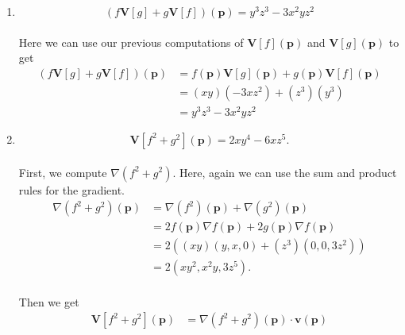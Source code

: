 \documentclass[12 pt, letterpaper]{hmcpset}
\begin{document}
\begin{solution}
\begin{enumerate}
			\[
				\boxed{
					\mathbf V[fg](\mathbf p) = y^3 z^3 - 3 x^2 y z^2
				}
			\] \\
			Note that here, we use the product rule for gradients --- $\nabla(fg) = (\nabla f) g + f (\nabla g)$
			\[
				\begin{split}
					\mathbf V[fg](\mathbf p) & = \nabla(fg) \cdot \mathbf v(\mathbf p) \\
								 & = ((\nabla f)(\mathbf p) g(\mathbf p) + f(\mathbf p) (\nabla g)(\mathbf p)) \cdot \mathbf v(\mathbf p) \\
								 & = g(\mathbf p) (\nabla f)(\mathbf p) \cdot \mathbf v(\mathbf p) + f(\mathbf p) (\nabla g(\mathbf p)) \cdot \mathbf v(\mathbf p) \\
								 & = z^3 y^3 - (xy)3xz^2 \\
								 & = y^3 z^3 - 3 x^2 y z^2.
				\end{split}
			\]
		\item
			\[
				\boxed{
					(f \mathbf V[g] + g \mathbf V[f])(\mathbf p) = y^3 z^3 - 3 x^2 y z^2
				}
			\] \\
			Here we can use our previous computations of $\mathbf V[f](\mathbf p)$ and $\mathbf V[g](\mathbf p)$ to get
			\[
				\begin{split}
					(f \mathbf V[g] + g \mathbf V[f])(\mathbf p) & = f(\mathbf p) \mathbf V[g](\mathbf p) + g(\mathbf p) \mathbf V[f](\mathbf p) \\
										     & = (xy)(-3xz^2) + (z^3)(y^3) \\
										     & = y^3 z^3 - 3 x^2 y z^2
				\end{split}
			\]
		\item
			\[
				\boxed{
					\mathbf V[f^2 + g^2](\mathbf p) = 2 x y^4 - 6 x z^5.
				}
			\] \\
			First, we compute $\nabla (f^2 + g^2)$. Here, again we can use the sum and product rules for the gradient.
			\[
				\begin{split}
					\nabla(f^2 + g^2)(\mathbf p) & = \nabla(f^2)(\mathbf p) + \nabla(g^2)(\mathbf p) \\
								     & = 2 f(\mathbf p) \nabla f(\mathbf p) + 2 g(\mathbf p) \nabla f(\mathbf p) \\
								     & = 2 ((xy)(y, x, 0) + (z^3)(0, 0, 3z^2)) \\
								     & = 2 (x y^2, x^2 y, 3z^5).
				\end{split}
			\] \\
			Then we get
			\[
				\begin{split}
					\mathbf V[f^2 + g^2](\mathbf p) & = \nabla(f^2 + g^2)(\mathbf p) \cdot \mathbf v(\mathbf p) \\

\end{split}\]
\end{enumerate}
\end{solution}
\end{document}
